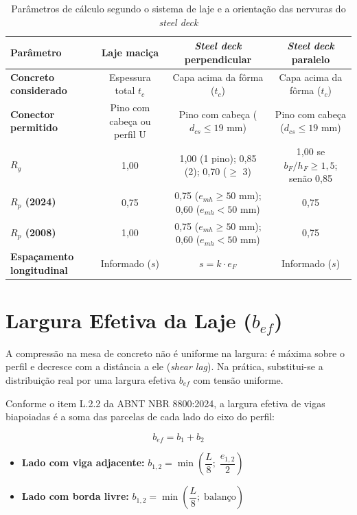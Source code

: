 \begin{table}[htbp]
  \centering
  \caption{Parâmetros de cálculo segundo o sistema de laje e a orientação das nervuras do \emph{steel deck}}\label{tab:sistemas-laje}
  {\footnotesize
  \begin{tabularx}{\textwidth}{>{\raggedright\arraybackslash}p{2.7cm}CCC}
  \toprule
  Parâmetro & Laje maciça & \emph{Steel deck} perpendicular & \emph{Steel deck} paralelo \\
  \midrule
  \textbf{Concreto considerado} & Espessura total $t_c$ & Capa acima da fôrma ($t_c$) & Capa acima da fôrma ($t_c$) \\
  \textbf{Conector permitido} & Pino com cabeça ou perfil U & Pino com cabeça ($d_{cs} \le 19$ mm) & Pino com cabeça ($d_{cs} \le 19$ mm) \\
  \textbf{$R_g$} & 1,00 & 1,00 (1 pino); 0,85 (2); 0,70 ($\ge$ 3) & 1,00 se $b_F/h_F \ge 1{,}5$; senão 0,85 \\
  \textbf{$R_p$ (2024)} & 0,75 & 0,75 ($e_{mh} \ge 50$ mm); 0,60 ($e_{mh} < 50$ mm) & 0,75 \\
  \textbf{$R_p$ (2008)} & 1,00 & 0,75 ($e_{mh} \ge 50$ mm); 0,60 ($e_{mh} < 50$ mm) & 0,75 \\
  \textbf{Espaçamento longitudinal} & Informado ($s$) & $s = k \cdot e_F$ & Informado ($s$) \\
  \bottomrule
  \end{tabularx}
  }
\end{table}

\section{Largura Efetiva da Laje ($b_{ef}$)}\label{sec:2.3}
A compressão na mesa de concreto não é uniforme na largura: é máxima sobre o perfil e decresce com a distância a ele (\emph{shear lag}). Na prática, substitui-se a distribuição real por uma largura efetiva $b_{ef}$ com tensão uniforme.

Conforme o item L.2.2 da ABNT NBR 8800:2024, a largura efetiva de vigas biapoiadas é a soma das parcelas de cada lado do eixo do perfil:

\[
  b_{ef} = b_1 + b_2
\]

\begin{itemize}
\item \textbf{Lado com viga adjacente:} $b_{1,2} = \min\left( \dfrac{L}{8};\; \dfrac{e_{1,2}}{2} \right)$
\item \textbf{Lado com borda livre:} $b_{1,2} = \min\left( \dfrac{L}{8};\; \text{balanço} \right)$
\end{itemize}

